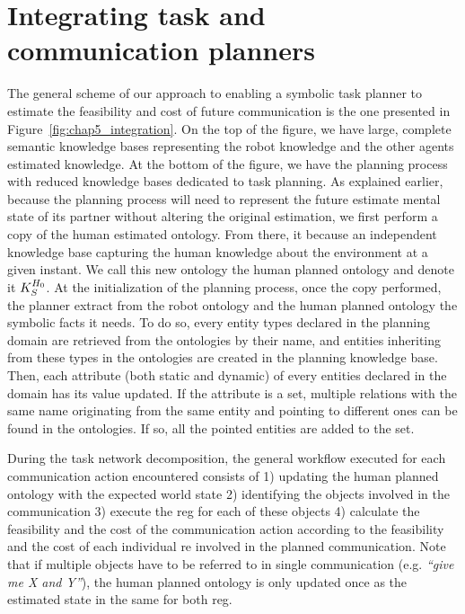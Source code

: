 \section[Integrating planners]{Integrating task and communication planners}

The general scheme of our approach to enabling a symbolic task planner to estimate the feasibility and cost of future communication is the one presented in Figure~\ref{fig:chap5_integration}. On the top of the figure, we have large, complete semantic knowledge bases representing the robot knowledge and the other agents estimated knowledge. At the bottom of the figure, we have the planning process with reduced knowledge bases dedicated to task planning. As explained earlier, because the planning process will need to represent the future estimate mental state of its partner without altering the original estimation, we first perform a copy of the human estimated ontology. From there, it because an independent knowledge base capturing the human knowledge about the environment at a given instant. We call this new ontology the human planned ontology and denote it $K_S^{H_0}$. At the initialization of the planning process, once the copy performed, the planner extract from the robot ontology and the human planned ontology the symbolic facts it needs. To do so, every entity types declared in the planning domain are retrieved from the ontologies by their name, and entities inheriting from these types in the ontologies are created in the planning knowledge base. Then, each attribute (both static and dynamic) of every entities declared in the domain has its value updated. If the attribute is a set, multiple relations with the same name originating from the same entity and pointing to different ones can be found in the ontologies. If so, all the pointed entities are added to the set.

During the task network decomposition, the general workflow executed for each communication action encountered consists of 1) updating the human planned ontology with the expected world state 2) identifying the objects involved in the communication 3) execute the \acrshort{reg} for each of these objects 4) calculate the feasibility and the cost of the communication action according to the feasibility and the cost of each individual \acrshort{re} involved in the planned communication. Note that if multiple objects have to be referred to in single communication (e.g. \textit{``give me X and Y''}), the human planned ontology is only updated once as the estimated state in the same for both \acrshort{reg}.

